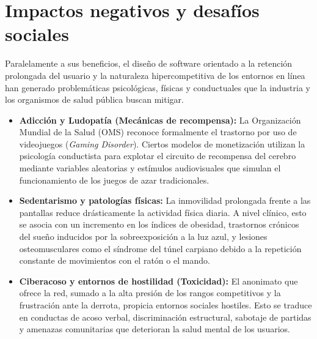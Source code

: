\documentclass[12pt]{report}
\begin{document}
\section{Impactos negativos y desafíos sociales}

Paralelamente a sus beneficios, el diseño de software orientado a la retención prolongada del usuario y la naturaleza hipercompetitiva de los entornos en línea han generado problemáticas psicológicas, físicas y conductuales que la industria y los organismos de salud pública buscan mitigar.

\begin{itemize}
    \item \textbf{Adicción y Ludopatía (Mecánicas de recompensa):} La Organización Mundial de la Salud (OMS) reconoce formalmente el trastorno por uso de videojuegos (\textit{Gaming Disorder}). Ciertos modelos de monetización utilizan la psicología conductista para explotar el circuito de recompensa del cerebro mediante variables aleatorias y estímulos audiovisuales que simulan el funcionamiento de los juegos de azar tradicionales.
    \item \textbf{Sedentarismo y patologías físicas:} La inmovilidad prolongada frente a las pantallas reduce drásticamente la actividad física diaria. A nivel clínico, esto se asocia con un incremento en los índices de obesidad, trastornos crónicos del sueño inducidos por la sobreexposición a la luz azul, y lesiones osteomusculares como el síndrome del túnel carpiano debido a la repetición constante de movimientos con el ratón o el mando.
    \item \textbf{Ciberacoso y entornos de hostilidad (Toxicidad):} El anonimato que ofrece la red, sumado a la alta presión de los rangos competitivos y la frustración ante la derrota, propicia entornos sociales hostiles. Esto se traduce en conductas de acoso verbal, discriminación estructural, sabotaje de partidas y amenazas comunitarias que deterioran la salud mental de los usuarios.
\end{itemize}
\end{document}
